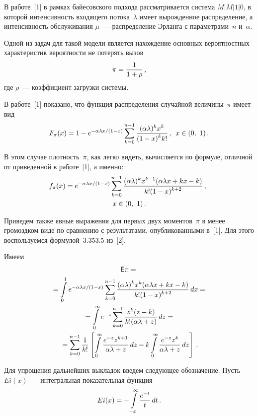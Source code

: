       \begin{multicols}{2}
      
            \label{st\stat}

В работе~[1] в рамках байесовского подхода рассматривается система
$M|M|1|0$, в которой интенсивность входящего потока~$\lambda$ имеет
вырожденное распределение, а интенсивность обслуживания $\mu$~---
распределение Эрланга с параметрами~$n$ и~$\alpha$.

Одной из задач для такой модели является нахождение основных вероятностных характеристик вероятности не потерять вызов
$$
\pi=\displaystyle\frac{\displaystyle 1\mathstrut}{\displaystyle 1+\rho\mathstrut}\,,
$$
где $\rho$~--- коэффициент загрузки системы.

В работе~[1] показано, что функция распределения случайной величины~$\pi$ имеет вид
\begin{equation*}
F_\pi(x)=1-e^{-{\alpha\lambda
x}/(1-x)}\sum_{k=0}^{n-1}\displaystyle\frac{\displaystyle (\alpha\lambda)^k x^k\mathstrut}{\displaystyle (1-x)^k k!\mathstrut}\,,\enskip x\in(0,\ 1)\,.
\end{equation*}

В этом случае плотность~$\pi$, как легко видеть, вычисляется по формуле, отличной от приведенной в работе~[1], а
именно:
\begin{multline*}
\hspace*{-5.127pt}f_\pi(x)=e^{-{\alpha\lambda x}/{(1-x)}}\sum_{k=0}^{n-1}\displaystyle\frac{\displaystyle (\alpha\lambda)^k x^{k-1}(\alpha\lambda x+k
x-k)\mathstrut}{\displaystyle k!(1-x)^{k+2}\mathstrut}\,,\\
 x\in(0,\ 1)\,.
 \end{multline*}

Приведем также явные выражения для первых двух моментов~$\pi$ в менее громоздком виде по сравнению с результатами,
опубликованными в~[1]. Для этого воспользуемся формулой~3.353.5 из~[2].

Имеем
\begin{multline*}
{\sf E}\pi={}\\
{}=\int\limits_{0}^{1}e^{-{\alpha\lambda x}/(1-x)} \sum_{k=0}^{n-1}\displaystyle\frac{\displaystyle (\alpha\lambda)^k x^k(\alpha\lambda x +k x
-k)\mathstrut}{\displaystyle k! (1-x)^{k+2}\mathstrut}\, dx={}\\
{}=\int\limits_{0}^{\infty}e^{-z} \sum_{k=0}^{n-1}\displaystyle\frac{\displaystyle z^k(z-k)\mathstrut}{\displaystyle k!(\alpha\lambda+z)\mathstrut}\, dz={}\\
{}=
\sum_{k=0}^{n-1}\displaystyle\frac{\displaystyle 1\mathstrut}{\displaystyle k!\mathstrut}\left[\int\limits_{0}^{\infty}\displaystyle\frac{\displaystyle e^{-z}z^{k+1}\mathstrut}{\displaystyle \alpha\lambda+z\mathstrut}\,
dz-k\int\limits_{0}^{\infty}\displaystyle\frac{\displaystyle e^{-z}z^k\mathstrut}{\displaystyle \alpha\lambda+z\mathstrut}\, dz\right]\,.
\end{multline*}

Для упрощения дальнейших выкладок введем следующее обозначение.
Пусть $Ei(x)$~--- интегральная показательная функция
$$
Ei(x)=-\int\limits_{-x}^{\infty}\displaystyle\frac{\displaystyle e^{-t}\mathstrut}{\displaystyle t\mathstrut}\,dt\,.
$$


\end{multicols}
